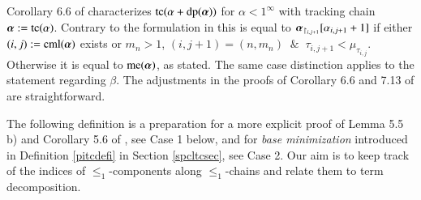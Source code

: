\documentclass[3p,10pt,times]{elsarticle}
\newcommand{\al}{\alpha}
\newcommand{\alvec}{{\vec{\al}}}
\newcommand{\be}{\beta}
\newcommand{\leo}{\le_1}
\newcommand{\andsp}{\:\&\:}
\newcommand{\oneinf}{1^\infty}
\newcommand{\tc}{{\mathrm{tc}}}
\newcommand{\dpf}{\mathrm{dp}}
\newcommand{\alcp}[1]{{\al_{#1}}}
\newcommand{\taucp}[1]{{\tau_{#1}}}
\newcommand{\cml}{\operatorname{cml}}
\newcommand{\me}{\operatorname{me}}
\def\vec#1{\mathchoice{\mbox{\boldmath$\displaystyle#1$}}
{\mbox{\boldmath$\textstyle#1$}}
{\mbox{\boldmath$\scriptstyle#1$}}
{\mbox{\boldmath$\scriptscriptstyle#1$}}}
\begin{document}
Corollary 6.6 of \cite{CWc} characterizes $\tc(\al+\dpf(\alvec))$ for $\al<\oneinf$ with tracking chain $\alvec:=\tc(\al)$.
Contrary to the formulation in \cite{CWc} this is equal to $\alvec_{\restriction_{i,j+1}}[\alcp{i,j+1}+1]$ if
either $(i,j):=\cml(\alvec)$ exists or $m_n>1$, $(i,j+1)=(n,m_n)$ $\andsp$ $\taucp{i,j+1}<\mu_\taucp{i,j}$. Otherwise it is equal to $\me(\alvec)$,
as stated. The same case distinction applies to the statement regarding $\be$. The adjustments in the proofs of Corollary 6.6 and 7.13 of 
\cite{CWc} are straightforward.

The following definition is a preparation for a more explicit proof of Lemma 5.5 b) and Corollary 5.6 of \cite{CWc}, see Case 1 below,
and for \emph{base minimization} introduced in Definition \ref{pitcdefi} in Section \ref{spcltcsec}, see Case 2. Our aim is to
keep track of the indices of $\leo$-components along $\leo$-chains and relate them to term decomposition.
\end{document}

